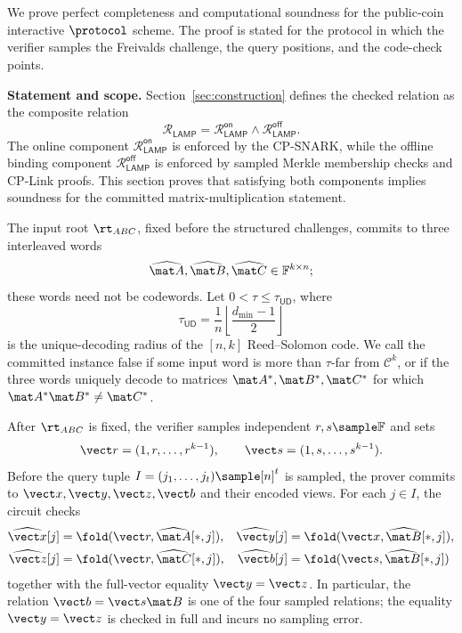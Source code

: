 \section[Security Analysis]{}
\label{sec:security}

\begin{revblock}
We prove perfect completeness and computational soundness for the public-coin
interactive \(\protocol\) scheme.  The proof is stated for the protocol in which
the verifier samples the Freivalds challenge, the query positions, and the
code-check points.

\noindent\textbf{Statement and scope.}
Section~\ref{sec:construction} defines the checked relation as the composite
relation
\[
  \mathcal{R}_{\mathsf{LAMP}}
  =
  \mathcal{R}_{\mathsf{LAMP}}^{\mathsf{on}}
  \land
  \mathcal{R}_{\mathsf{LAMP}}^{\mathsf{off}}.
\]
The online component
\(\mathcal{R}_{\mathsf{LAMP}}^{\mathsf{on}}\) is enforced by the CP-SNARK,
while the offline binding component
\(\mathcal{R}_{\mathsf{LAMP}}^{\mathsf{off}}\) is enforced by sampled Merkle
membership checks and CP-Link proofs.  This section proves that satisfying both
components implies soundness for the committed matrix-multiplication statement.

The input root \(\rt_{ABC}\), fixed before the structured challenges, commits
to three interleaved words
\[
  \widehat{\mat A},\widehat{\mat B},\widehat{\mat C}
  \in\mathbb F^{k\times n};
\]
these words need not be codewords.  Let \(0<\tau\le\tau_{\mathsf{UD}}\), where
\[
  \tau_{\mathsf{UD}}
  =\frac{1}{n}\left\lfloor\frac{d_{\min}-1}{2}\right\rfloor
\]
is the unique-decoding radius of the \([n,k]\) Reed--Solomon code.  We call the
committed instance false if some input word is more than \(\tau\)-far from
\(\mathcal C^k\), or if the three words uniquely decode to matrices
\(\mat A^*,\mat B^*,\mat C^*\) for which
\(\mat A^*\mat B^*\ne\mat C^*\).

After \(\rt_{ABC}\) is fixed, the verifier samples independent
\(r,s\sample\mathbb F\) and sets
\[
  \vect r=(1,r,\ldots,r^{k-1}),\qquad
  \vect s=(1,s,\ldots,s^{k-1}).
\]
Before the query tuple \(I=(j_1,\ldots,j_t)\sample[n]^t\) is sampled, the
prover commits to \(\vect x,\vect y,\vect z,\vect b\) and their encoded views.
For each \(j\in I\), the circuit checks
\[
\begin{aligned}
 \widehat{\vect x}[j]&=\fold(\vect r,\widehat{\mat A}[*,j]),&
 \widehat{\vect y}[j]&=\fold(\vect x,\widehat{\mat B}[*,j]),\\
 \widehat{\vect z}[j]&=\fold(\vect r,\widehat{\mat C}[*,j]),&
 \widehat{\vect b}[j]&=\fold(\vect s,\widehat{\mat B}[*,j])
\end{aligned}
\]
together with the full-vector equality \(\vect y=\vect z\).  In particular,
the relation \(\vect b=\vect s\mat B\) is one of the four sampled relations;
the equality \(\vect y=\vect z\) is checked in full and incurs no sampling
error.


\end{revblock}
